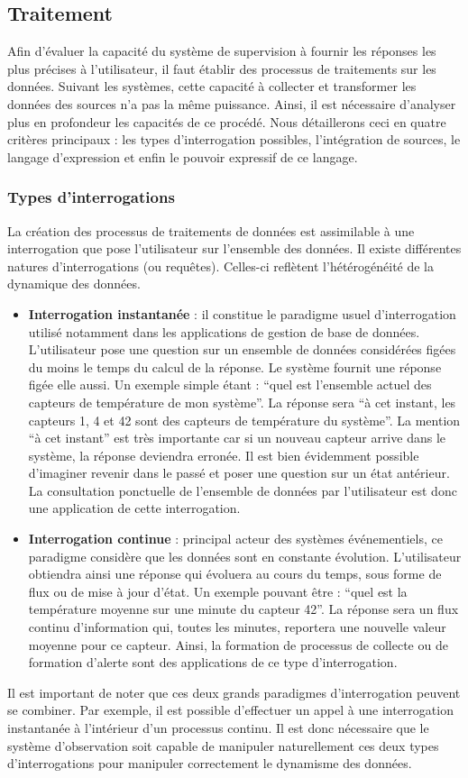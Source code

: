 \subsection{Traitement}
Afin d'évaluer la capacité du système de supervision à fournir les réponses les plus précises à l'utilisateur, il faut établir des processus de traitements sur les données. Suivant les systèmes, cette capacité à collecter et transformer les données des sources n'a pas la même puissance. Ainsi, il est nécessaire d'analyser plus en profondeur les capacités de ce procédé. Nous détaillerons ceci en quatre critères principaux : les types d'interrogation possibles, l'intégration de sources, le langage d'expression et enfin le pouvoir expressif de ce langage.

\subsubsection{Types d'interrogations}
La création des processus de traitements de données est assimilable à une interrogation que pose l'utilisateur sur l'ensemble des données. Il existe différentes natures d'interrogations (ou requêtes). Celles-ci reflètent l'hétérogénéité de la dynamique des données.
\begin{itemize}
    \item \textbf{Interrogation instantanée} : il constitue le paradigme usuel d'interrogation utilisé notamment dans les applications de gestion de base de données. L'utilisateur pose une question sur un ensemble de données considérées figées du moins le temps du calcul de la réponse. Le système fournit une réponse figée elle aussi. Un exemple simple étant : ``quel est l'ensemble actuel des capteurs de température de mon système''. La réponse sera ``à cet instant, les capteurs 1, 4 et 42 sont des capteurs de température du système''. La mention ``à cet instant'' est très importante car si un nouveau capteur arrive dans le système, la réponse deviendra erronée. Il est bien évidemment possible d'imaginer revenir dans le passé et poser une question sur un état antérieur. La consultation ponctuelle de l'ensemble de données par l'utilisateur est donc une application de cette interrogation.
    \item \textbf{Interrogation continue} : principal acteur des systèmes événementiels, ce paradigme considère que les données sont en constante évolution. L'utilisateur obtiendra ainsi une réponse qui évoluera au cours du temps, sous forme de flux ou de mise à jour d'état. Un exemple pouvant être : ``quel est la température moyenne sur une minute du capteur 42''. La réponse sera un flux continu d'information qui, toutes les minutes, reportera une nouvelle valeur moyenne pour ce capteur. Ainsi, la formation de processus de collecte ou de formation d'alerte sont des applications de ce type d'interrogation.
\end{itemize}
Il est important de noter que ces deux grands paradigmes d'interrogation peuvent se combiner. Par exemple, il est possible d'effectuer un appel à une interrogation instantanée à l'intérieur d'un processus continu. Il est donc nécessaire que le système d'observation soit capable de manipuler naturellement ces deux types d'interrogations pour manipuler correctement le dynamisme des données.

